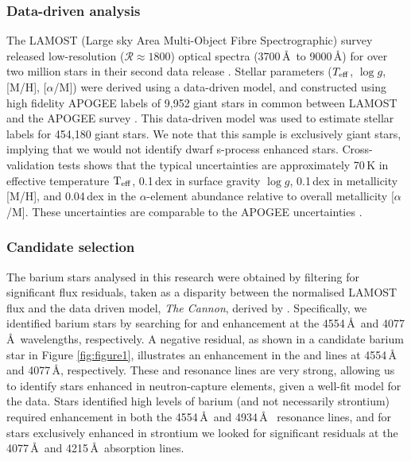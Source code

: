 \documentclass[a4paper,fleqn,usenatbib]{mnras}
\begin{document}
\subsubsection{Data-driven analysis}
The LAMOST (Large sky Area Multi-Object Fibre Spectrographic) survey released low-resolution ($\mathcal{R} \approx 1800$) optical spectra (3700\,\AA\ to 9000\,\AA) for over two million stars in their second data release \citep{luo2015}. Stellar parameters ($T_{\rm eff}$, $\log{g}$, [M/H], [$\alpha$/M]) were derived using a data-driven model, and constructed using high fidelity APOGEE labels of 9,952 giant stars in common between LAMOST and the APOGEE survey \citep{ho2017}. This data-driven model was used to estimate stellar labels for 454,180 giant stars. We note that this sample is exclusively giant stars, implying that we would not identify dwarf s-process enhanced stars. Cross-validation tests shows that the typical uncertainties are approximately 70\,K in effective temperature $\rm T_{\rm eff}$, 0.1\,dex in surface gravity $\log{g}$, 0.1\,dex in metallicity [M/H], and 0.04\,dex in the $\alpha$-element abundance relative to overall metallicity [$\alpha$/M]. These uncertainties are comparable to the APOGEE uncertainties \citep{alam2015}.


\subsubsection{Candidate selection} \label{sec:cand}
The barium stars analysed in this research were obtained by filtering for significant flux residuals, taken as a disparity between the normalised LAMOST flux and the data driven model, \emph{The Cannon}, derived by \citet{ho2017}. Specifically, we identified barium stars by searching for  and  enhancement at the 4554\,\AA\ and 4077\,\AA\ wavelengths, respectively. A negative residual, as shown in a candidate barium star in Figure \ref{fig:figure1}, illustrates an enhancement in the  and  lines at 4554\,\AA\, and 4077\,\AA, respectively. These  and  resonance lines are very strong, allowing us to identify stars enhanced in neutron-capture elements, given a well-fit model for the data. Stars identified high levels of barium (and not necessarily strontium) required enhancement in both the 4554\,\AA\ and 4934\,\AA\  resonance lines, and for stars exclusively enhanced in strontium we looked for significant residuals at the 4077\,\AA\ and 4215\,\AA\ absorption lines.  
\end{document}

